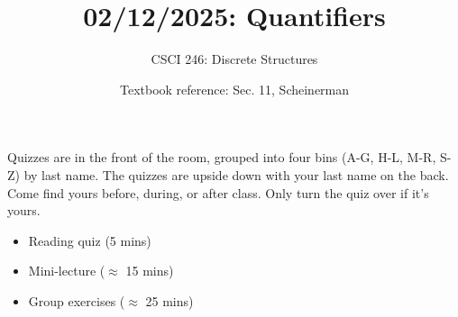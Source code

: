 \documentclass[10pt]{beamer}
\begin{document}






\title{02/12/2025: Quantifiers}
\author{CSCI 246: Discrete Structures}
\date{Textbook reference: Sec. 11, Scheinerman}

\begin{frame}
    \titlepage 
\end{frame}


\begin{frame}
\footnotesize 
\begin{mygreenbox}[title=Graded Quiz Pickup]
Quizzes are in the front of the room, grouped into four bins (A-G, H-L, M-R, S-Z) by last name. The quizzes are upside down with your last name on the back. Come find yours before, during, or after class.  Only turn the quiz over if it's yours.
\end{mygreenbox} 
\vfill 

%
%
%


\begin{myyellowbox}[title=Today's Agenda]
\begin{itemize}
	\item Reading quiz (5 mins)
	\item Mini-lecture ($\approx$ 15 mins)
	\item Group exercises ($\approx$ 25 mins)
\end{itemize}

\end{myyellowbox}
\vfill 

\end{frame}
\end{document}
